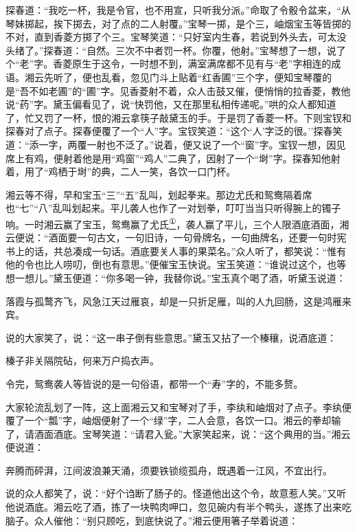 探春道：``我吃一杯，我是令官，也不用宣，只听我分派。''命取了令骰令盆来，``从琴妹掷起，挨下掷去，对了点的二人射覆。''宝琴一掷，是个三，岫烟宝玉等皆掷的不对，直到香菱方掷了个三。宝琴笑道：``只好室内生春，若说到外头去，可太没头绪了。''探春道：``自然。三次不中者罚一杯。你覆，他射。''宝琴想了一想，说了个``老''字。香菱原生于这令，一时想不到，满室满席都不见有与``老''字相连的成语。湘云先听了，便也乱看，忽见门斗上贴着``红香圃''三个字，便知宝琴覆的是``吾不如老圃''的``圃''字。见香菱射不着，众人击鼓又催，便悄悄的拉香菱，教他说``药''字。黛玉偏看见了，说``快罚他，又在那里私相传递呢。''哄的众人都知道了，忙又罚了一杯，恨的湘云拿筷子敲黛玉的手。于是罚了香菱一杯。下则宝钗和探春对了点子。探春便覆了一个``人''字。宝钗笑道：``这个`人'字泛的很。''探春笑道：``添一字，两覆一射也不泛了。''说着，便又说了一个``窗''字。宝钗一想，因见席上有鸡，便射着他是用``鸡窗''``鸡人''二典了，因射了一个``埘''字。探春知他射着，用了``鸡栖于埘''的典，二人一笑，各饮一口门杯。

湘云等不得，早和宝玉``三''``五''乱叫，划起拳来。那边尤氏和鸳鸯隔着席也``七''``八''乱叫划起来。平儿袭人也作了一对划拳，叮叮当当只听得腕上的镯子响。一时湘云赢了宝玉，鸳鸯赢了尤氏\href{../Text/part0066_split_000.html\#lnkback_1_a}{\textsuperscript{①}}，袭人赢了平儿，三个人限酒底酒面，湘云便说：``酒面要一句古文，一句旧诗，一句骨牌名，一句曲牌名，还要一句时宪书上的话，共总凑成一句话。酒底要关人事的果菜名。''众人听了，都笑说：``惟有他的令也比人唠叨，倒也有意思。''便催宝玉快说。宝玉笑道：``谁说过这个，也等想一想儿。''黛玉便道：``你多喝一钟，我替你说。''宝玉真个喝了酒，听黛玉说道：

落霞与孤鹜齐飞，风急江天过雁哀，却是一只折足雁，叫的人九回肠，这是鸿雁来宾。

说的大家笑了，说：``这一串子倒有些意思。''黛玉又拈了一个榛穰，说酒底道：

榛子非关隔院砧，何来万户捣衣声。

令完，鸳鸯袭人等皆说的是一句俗语，都带一个``寿''字的，不能多赘。

大家轮流乱划了一阵，这上面湘云又和宝琴对了手，李纨和岫烟对了点子。李纨便覆了一个``瓢''字，岫烟便射了一个``绿''字，二人会意，各饮一口。湘云的拳却输了，请酒面酒底。宝琴笑道：``请君入瓮。''大家笑起来，说：``这个典用的当。''湘云便说道：

奔腾而砰湃，江间波浪兼天涌，须要铁锁缆孤舟，既遇着一江风，不宜出行。

说的众人都笑了，说：``好个诌断了肠子的。怪道他出这个令，故意惹人笑。''又听他说酒底。湘云吃了酒，拣了一块鸭肉呷口，忽见碗内有半个鸭头，遂拣了出来吃脑子。众人催他：``别只顾吃，到底快说了。''湘云便用箸子举着说道：

